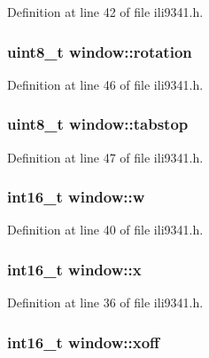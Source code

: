 Definition at line 42 of file ili9341.\-h.

\hypertarget{structwindow_afbd48ebcb41e68d0f458dac593578aa8}{
\subsubsection[{rotation}]{\setlength{\rightskip}{0pt plus 5cm}uint8\-\_\-t window\-::rotation}}\label{structwindow_afbd48ebcb41e68d0f458dac593578aa8}


Definition at line 46 of file ili9341.\-h.

\hypertarget{structwindow_a88d2836d45dd428d8fadfd703f0f965f}{
\subsubsection[{tabstop}]{\setlength{\rightskip}{0pt plus 5cm}uint8\-\_\-t window\-::tabstop}}\label{structwindow_a88d2836d45dd428d8fadfd703f0f965f}


Definition at line 47 of file ili9341.\-h.

\hypertarget{structwindow_ad89fdeb11ce94e2e7501f7290372d6ae}{
\subsubsection[{w}]{\setlength{\rightskip}{0pt plus 5cm}int16\-\_\-t window\-::w}}\label{structwindow_ad89fdeb11ce94e2e7501f7290372d6ae}


Definition at line 40 of file ili9341.\-h.

\hypertarget{structwindow_a879b99940dfc34772f0257f54c67b817}{
\subsubsection[{x}]{\setlength{\rightskip}{0pt plus 5cm}int16\-\_\-t window\-::x}}\label{structwindow_a879b99940dfc34772f0257f54c67b817}


Definition at line 36 of file ili9341.\-h.

\hypertarget{structwindow_a12d0408f393bc8d23cc3f1ce46c39879}{
\subsubsection[{xoff}]{\setlength{\rightskip}{0pt plus 5cm}int16\-\_\-t window\-::xoff}}\label{structwindow_a12d0408f393bc8d23cc3f1ce46c39879}


